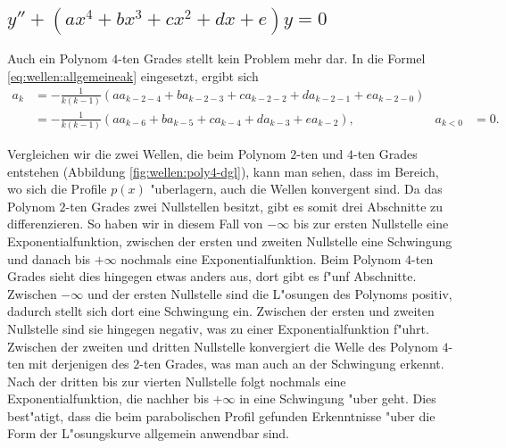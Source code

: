 \subsection{\texorpdfstring{$y''+(ax^4+bx^3+cx^2+dx+e)y = 
0$}{y''-(ax4+bx3+cx2+dx+e)y = 0}}

Auch ein Polynom $4$-ten Grades stellt kein Problem mehr dar. In die 
Formel \eqref{eq:wellen:allgemeineak} eingesetzt, ergibt sich
\begin{align*}
		a_k &= -\frac{1}{k(k-1)} (aa_{k-2-4} + 
		ba_{k-2-3} + ca_{k-2-2} + da_{k-2-1} +ea_{k-2-0})
		\\
		&= -\frac{1}{k(k-1)} (aa_{k-6} + ba_{k-5} + 
		ca_{k-4} + da_{k-3} +ea_{k-2}), &a_{k<0} &= 0.
\end{align*}

Vergleichen wir die zwei Wellen, die beim Polynom $2$-ten und $4$-ten Grades 
entstehen (Abbildung \ref{fig:wellen:poly4-dgl}), kann man sehen, 
dass im Bereich, wo sich die Profile $p(x)$ "uberlagern, auch die Wellen 
konvergent sind. Da das Polynom $2$-ten Grades zwei Nullstellen besitzt, gibt 
es somit drei Abschnitte zu differenzieren. So haben wir in diesem Fall von 
$-\infty$ bis zur ersten Nullstelle eine Exponentialfunktion, zwischen der 
ersten und zweiten Nullstelle eine Schwingung und danach bis $+\infty$ nochmals 
eine Exponentialfunktion. Beim Polynom $4$-ten Grades sieht dies hingegen etwas 
anders aus, dort gibt es f"unf Abschnitte. Zwischen $-\infty$ und der ersten 
Nullstelle sind die L"osungen des Polynoms positiv, dadurch stellt sich dort 
eine Schwingung ein. Zwischen der ersten und zweiten Nullstelle sind sie 
hingegen negativ, was zu einer Exponentialfunktion f"uhrt. Zwischen der zweiten 
und dritten Nullstelle konvergiert die Welle des Polynom $4$-ten mit derjenigen 
des $2$-ten Grades, was man auch an der Schwingung erkennt. Nach der dritten 
bis zur vierten Nullstelle folgt nochmals eine Exponentialfunktion, die nachher 
bis $+\infty$ in eine Schwingung "uber geht. Dies best"atigt, dass die beim 
parabolischen Profil gefunden Erkenntnisse "uber die Form der L"osungskurve 
allgemein anwendbar sind.

